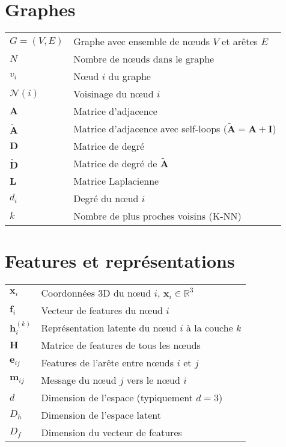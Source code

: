 
\section*{Graphes}

\begin{tabular}{p{2.5cm} p{11cm}}
  \hline
  $G = (V, E)$ & Graphe avec ensemble de nœuds $V$ et arêtes $E$\\
  $N$ & Nombre de nœuds dans le graphe\\
  $v_i$ & Nœud $i$ du graphe\\
  $\mathcal{N}(i)$ & Voisinage du nœud $i$\\
  $\mathbf{A}$ & Matrice d'adjacence\\
  $\tilde{\mathbf{A}}$ & Matrice d'adjacence avec self-loops ($\tilde{\mathbf{A}} = \mathbf{A} + \mathbf{I}$)\\
  $\mathbf{D}$ & Matrice de degré\\
  $\tilde{\mathbf{D}}$ & Matrice de degré de $\tilde{\mathbf{A}}$\\
  $\mathbf{L}$ & Matrice Laplacienne\\
  $d_i$ & Degré du nœud $i$\\
  $k$ & Nombre de plus proches voisins (K-NN)\\
  \hline
\end{tabular}

\section*{Features et représentations}

\begin{tabular}{p{2.5cm} p{11cm}}
  \hline
  $\mathbf{x}_i$ & Coordonnées 3D du nœud $i$, $\mathbf{x}_i \in \mathbb{R}^3$\\
  $\mathbf{f}_i$ & Vecteur de features du nœud $i$\\
  $\mathbf{h}_i^{(k)}$ & Représentation latente du nœud $i$ à la couche $k$\\
  $\mathbf{H}$ & Matrice de features de tous les nœuds\\
  $\mathbf{e}_{ij}$ & Features de l'arête entre nœuds $i$ et $j$\\
  $\mathbf{m}_{ij}$ & Message du nœud $j$ vers le nœud $i$\\
  $d$ & Dimension de l'espace (typiquement $d=3$)\\
  $D_h$ & Dimension de l'espace latent\\
  $D_f$ & Dimension du vecteur de features\\
  \hline
\end{tabular}

